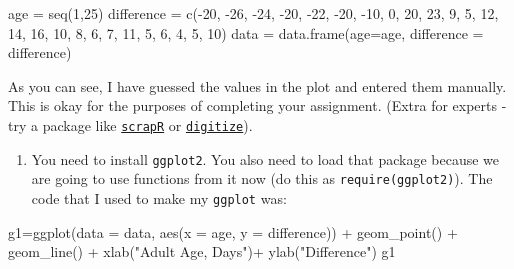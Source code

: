 \documentclass[
]{book}
\newenvironment{Shaded}{\begin{snugshade}}{\end{snugshade}}
\newcommand{\AttributeTok}[1]{\textcolor[rgb]{0.77,0.63,0.00}{#1}}
\newcommand{\DecValTok}[1]{\textcolor[rgb]{0.00,0.00,0.81}{#1}}
\newcommand{\FunctionTok}[1]{\textcolor[rgb]{0.00,0.00,0.00}{#1}}
\newcommand{\NormalTok}[1]{#1}
\newcommand{\OtherTok}[1]{\textcolor[rgb]{0.56,0.35,0.01}{#1}}
\newcommand{\SpecialCharTok}[1]{\textcolor[rgb]{0.00,0.00,0.00}{#1}}
\newcommand{\StringTok}[1]{\textcolor[rgb]{0.31,0.60,0.02}{#1}}
\providecommand{\tightlist}{%
  \setlength{\itemsep}{0pt}\setlength{\parskip}{0pt}}
\begin{document}
\begin{Shaded}
\begin{Highlighting}[]
\NormalTok{age }\OtherTok{=} \FunctionTok{seq}\NormalTok{(}\DecValTok{1}\NormalTok{,}\DecValTok{25}\NormalTok{)}
\NormalTok{difference }\OtherTok{=} \FunctionTok{c}\NormalTok{(}\SpecialCharTok{{-}}\DecValTok{20}\NormalTok{, }\SpecialCharTok{{-}}\DecValTok{26}\NormalTok{, }\SpecialCharTok{{-}}\DecValTok{24}\NormalTok{, }\SpecialCharTok{{-}}\DecValTok{20}\NormalTok{, }\SpecialCharTok{{-}}\DecValTok{22}\NormalTok{, }\SpecialCharTok{{-}}\DecValTok{20}\NormalTok{, }\SpecialCharTok{{-}}\DecValTok{10}\NormalTok{, }\DecValTok{0}\NormalTok{,}
               \DecValTok{20}\NormalTok{, }\DecValTok{23}\NormalTok{, }\DecValTok{9}\NormalTok{, }\DecValTok{5}\NormalTok{, }\DecValTok{12}\NormalTok{, }\DecValTok{14}\NormalTok{, }\DecValTok{16}\NormalTok{, }\DecValTok{10}\NormalTok{, }\DecValTok{8}\NormalTok{, }\DecValTok{6}\NormalTok{, }\DecValTok{7}\NormalTok{, }\DecValTok{11}\NormalTok{, }\DecValTok{5}\NormalTok{, }\DecValTok{6}\NormalTok{, }\DecValTok{4}\NormalTok{, }\DecValTok{5}\NormalTok{, }\DecValTok{10}\NormalTok{)}
\NormalTok{data }\OtherTok{=} \FunctionTok{data.frame}\NormalTok{(}\AttributeTok{age=}\NormalTok{age, }\AttributeTok{difference =}\NormalTok{ difference)}
\end{Highlighting}
\end{Shaded}

As you can see, I have guessed the values in the plot and entered them manually. This is okay for the purposes of completing your assignment. (Extra for experts - try a package like \href{https://github.com/adamkucharski/scrapR}{\texttt{scrapR}} or \href{https://github.com/tpoisot/digitize}{\texttt{digitize}}).

\begin{enumerate}
\def\labelenumi{\arabic{enumi}.}
\setcounter{enumi}{5}
\tightlist
\item
  You need to install \texttt{ggplot2}. You also need to load that package because we are going to use functions from it now (do this as \texttt{require(ggplot2)}). The code that I used to make my \texttt{ggplot} was:
\end{enumerate}

\begin{Shaded}
\begin{Highlighting}[]
\NormalTok{g1}\OtherTok{=}\FunctionTok{ggplot}\NormalTok{(}\AttributeTok{data =}\NormalTok{ data, }\FunctionTok{aes}\NormalTok{(}\AttributeTok{x =}\NormalTok{ age, }\AttributeTok{y =}\NormalTok{ difference)) }\SpecialCharTok{+} 
  \FunctionTok{geom\_point}\NormalTok{() }\SpecialCharTok{+}
  \FunctionTok{geom\_line}\NormalTok{() }\SpecialCharTok{+}
  \FunctionTok{xlab}\NormalTok{(}\StringTok{"Adult Age, Days"}\NormalTok{)}\SpecialCharTok{+}
  \FunctionTok{ylab}\NormalTok{(}\StringTok{"Difference"}\NormalTok{)}
\NormalTok{g1}
\end{Highlighting}
\end{Shaded}
\end{document}
